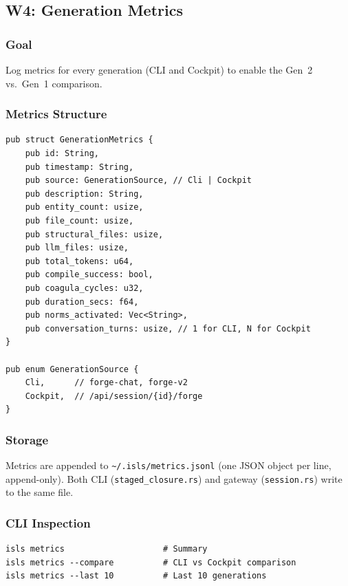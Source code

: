 \documentclass[11pt,a4paper]{article}
\begin{document}
\subsection{W4: Generation Metrics}
\label{sec:w4}

\subsubsection{Goal}

Log metrics for every generation (CLI and Cockpit) to enable 
the Gen~2 vs.\ Gen~1 comparison.

\subsubsection{Metrics Structure}

\begin{lstlisting}[style=rust]
pub struct GenerationMetrics {
    pub id: String,
    pub timestamp: String,
    pub source: GenerationSource, // Cli | Cockpit
    pub description: String,
    pub entity_count: usize,
    pub file_count: usize,
    pub structural_files: usize,
    pub llm_files: usize,
    pub total_tokens: u64,
    pub compile_success: bool,
    pub coagula_cycles: u32,
    pub duration_secs: f64,
    pub norms_activated: Vec<String>,
    pub conversation_turns: usize, // 1 for CLI, N for Cockpit
}

pub enum GenerationSource {
    Cli,      // forge-chat, forge-v2
    Cockpit,  // /api/session/{id}/forge
}
\end{lstlisting}

\subsubsection{Storage}

Metrics are appended to \texttt{\textasciitilde/.isls/metrics.jsonl} 
(one JSON object per line, append-only). Both CLI 
(\texttt{staged\_closure.rs}) and gateway (\texttt{session.rs}) 
write to the same file.

\subsubsection{CLI Inspection}

\begin{lstlisting}[style=bash]
isls metrics                    # Summary
isls metrics --compare          # CLI vs Cockpit comparison
isls metrics --last 10          # Last 10 generations
\end{lstlisting}
\end{document}
